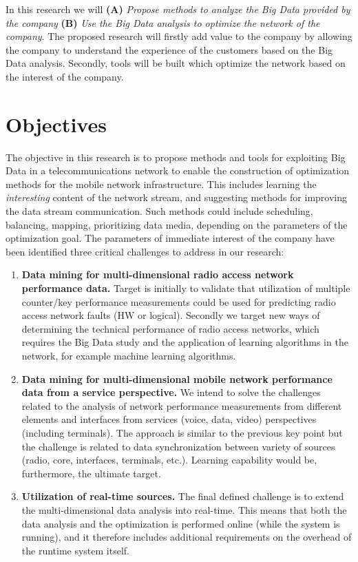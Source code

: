 \documentclass{article}
\begin{document}
In this research we will \textbf{(A)} \textit{Propose methods to analyze the Big Data provided by the company} \textbf{(B)} \textit{Use the Big Data analysis to optimize the network of the company}.
The proposed research will firstly add value to the company by allowing the company to understand the experience of the customers based on the Big Data analysis.
Secondly, tools will be built which optimize the network based on the interest of the company.


\section{Objectives}
The objective in this research is to propose methods and tools for exploiting Big Data in a telecommunications network to enable the construction of optimization methods for the mobile network infrastructure.
This includes learning the \textit{interesting} content of the network stream, and suggesting methods for improving the data stream communication.
Such methods could include scheduling, balancing, mapping, prioritizing data media, depending on the parameters of the optimization goal.
The parameters of immediate interest of the company have been identified three critical challenges to address in our research:
\begin{enumerate}
 \item 
\textbf{Data mining for multi-dimensional radio access network performance data.} Target is initially to validate that utilization of multiple counter/key performance measurements could be used for predicting radio access network faults (HW or logical). 
Secondly we target new ways of determining the technical performance of radio access networks, which requires the Big Data study and the application of learning algorithms in the network, for example machine learning algorithms.

\item
\textbf{Data mining for multi-dimensional mobile network performance data from a service perspective.}
We intend to solve the challenges related to the analysis of network performance measurements from different elements and interfaces from services (voice, data, video) perspectives (including terminals). 
The approach is similar to the previous key point but the challenge is related to data synchronization between variety of sources (radio, core, interfaces, terminals, etc.). 
Learning capability would be, furthermore, the ultimate target.

\item
\textbf{Utilization of real-time sources.}  
The final defined challenge is to extend the multi-dimensional data analysis into real-time.
This means that both the data analysis and the optimization is performed online (while the system is running), and it therefore includes additional requirements on the overhead of the runtime system itself.
\end{enumerate}
\end{document}
